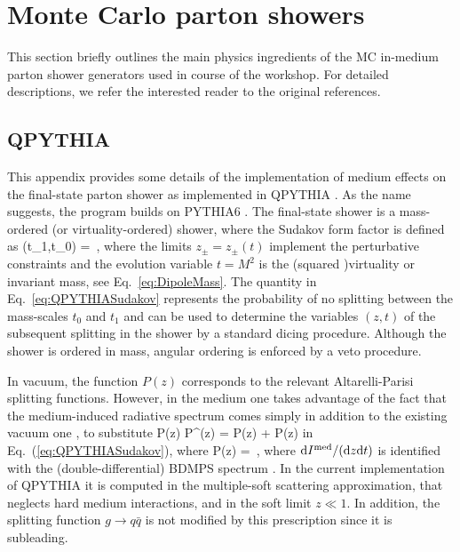 
\section{Monte Carlo parton showers}
\label{app:models}

This section briefly outlines the main physics ingredients of the MC in-medium parton shower generators used in course of the workshop. For detailed descriptions, we refer the interested reader to the original references.

\subsection{QPYTHIA}
\label{app:qpythia}

This appendix provides some details of the implementation of medium effects on the final-state parton shower as implemented in QPYTHIA \cite{Armesto:2009fj}. As the name suggests, the program builds on PYTHIA6 \cite{Sjostrand:2007gs,Sjostrand:2008vc}. The final-state shower is a mass-ordered (or virtuality-ordered) shower, where the Sudakov form factor is defined as
\beq
\label{eq:QPYTHIASudakov}
\Delta(t_1,t_0) = \exp{} \,,
\eeq
where the limits $z_\pm = z_\pm(t)$ implement the perturbative constraints and the evolution variable $t = M^2$ is the (squared )virtuality or invariant mass, see Eq.~\eqref{eq:DipoleMass}. The quantity in Eq.~\eqref{eq:QPYTHIASudakov} represents the probability of no splitting between the mass-scales $t_0$ and $t_1$ and can be used to determine the variables $(z,t)$ of the subsequent splitting in the shower by a standard dicing procedure. Although the shower is ordered in mass, angular ordering is enforced by a veto procedure.

In vacuum, the function $P(z)$ corresponds to the relevant Altarelli-Parisi splitting functions. However, in the medium one takes advantage of the fact that the medium-induced radiative spectrum comes simply in addition to the existing vacuum one \cite{Wang:2001ifa,Polosa:2006hb}, to substitute
\beq
P(z) \to P^\tot(z) = P(z) + \Delta P(z)
\eeq
in Eq.~(\ref{eq:QPYTHIASudakov}), where 
\beq
\Delta P(z) =   \,,
\eeq
where $\text{d} I^{\text{med}} /(\text{d} z \text{d} t)$ is identified with the (double-differential) BDMPS spectrum \cite{Baier:1996sk}. In the current implementation of QPYTHIA it is computed in the multiple-soft scattering approximation, that neglects hard medium interactions, and in the soft limit $z \ll 1$. In addition, the splitting function $g \to q\bar q$ is not modified by this prescription since it is subleading.

